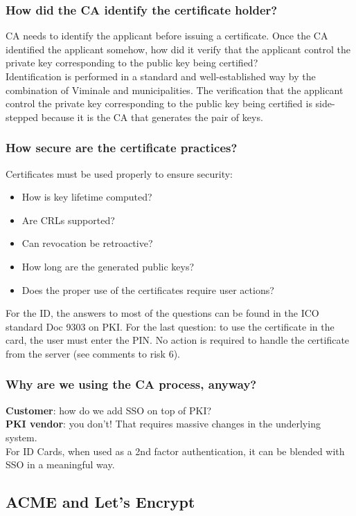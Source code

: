 \documentclass[a4paper, 10pt, titlepage]{article}
\begin{document}
\begin{footnotesize}
\subsubsection*{How did the CA identify the certificate holder?}
CA needs to identify the applicant before issuing a certificate. Once the CA identified the applicant somehow, how did it verify that the applicant control the private key corresponding to the public key
being certified? \medskip\\
Identification is performed in a standard and well-established way by the combination of Viminale and municipalities. The verification that the applicant control the private key corresponding to the public key being certified is side-stepped because it is the CA that generates the pair of keys.
\subsubsection*{How secure are the certificate practices?}
Certificates must be used properly to ensure security:
\begin{itemize}
\item How is key lifetime computed?
\item Are CRLs supported?
\item Can revocation be retroactive?
\item How long are the generated public keys?
\item Does the proper use of the certificates require user actions?
\end{itemize} \medskip
For the ID, the answers to most of the questions can be found in the ICO standard Doc 9303 on PKI. For the last question: to use the certificate in the card, the user must enter the PIN. No action is required to handle the certificate from the server (see comments to risk 6).
\subsubsection*{Why are we using the CA process, anyway?}
\textbf{Customer}: how do we add SSO on top of PKI?\\
\textbf{PKI vendor}: you don’t! That requires massive changes in the underlying system. \medskip\\
For ID Cards, when used as a 2nd factor authentication, it can be blended with SSO in a meaningful way.
\end{footnotesize}

\newpage
\subsection{ACME and Let's Encrypt}
\end{document}
